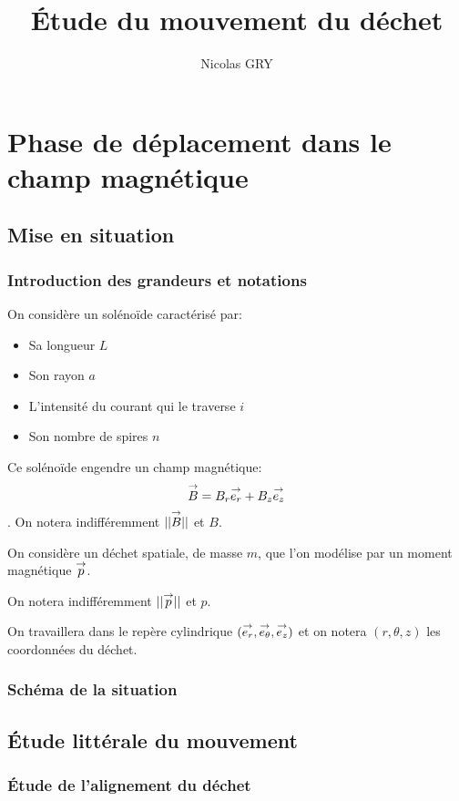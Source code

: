 \documentclass{report}
\author{Nicolas GRY}
\title{Étude du mouvement du déchet}
\begin{document}
\maketitle
\tableofcontents
\newpage
\chapter{Phase de déplacement dans le champ magnétique}
\section{Mise en situation}
\subsection{Introduction des grandeurs et notations}

On considère un solénoïde caractérisé par:
\begin{itemize}
    \item Sa longueur $L$
    \item Son rayon $a$
    \item L'intensité du courant qui le traverse $i$
    \item Son nombre de spires $n$ 
\end{itemize}
Ce solénoïde engendre un champ magnétique:
 $$\overset{\to}{B} = B_r \overset{\to}{e_r} + B_z \overset{\to}{e_z}$$.
On notera indifféremment $||\overset{\to}{B}||$ et $B$.

On considère un déchet spatiale, de masse $m$, que l'on modélise par un moment magnétique $\overset{\to}{p}$. 

On notera indifféremment $||\overset{\to}{p}||$ et $p$.

On travaillera dans le repère cylindrique $(\overset{\to}{e_r},\overset{\to}{e_\theta},\overset{\to}{e_z})$ et on notera $(r,\theta,z)$ les coordonnées du déchet.

\subsection{Schéma de la situation}


\section{Étude littérale du mouvement}
\subsection{Étude de l'alignement du déchet}
\end{document}
